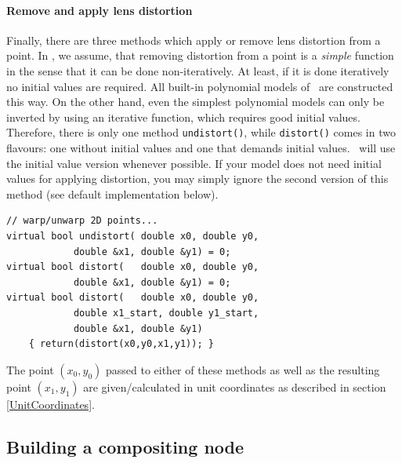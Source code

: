 \documentclass[10pt,a4paper]{article}
\begin{document}
\paragraph{Remove and apply lens distortion}
Finally, there are three methods which apply or remove lens distortion from a point.
In \tde, we assume, that removing distortion from a point is a {\it simple} function
in the sense that it can be done non-iteratively. At least, if it is done iteratively
no initial values are required. All built-in polynomial models of \tde\ are constructed
this way. On the other hand, even the simplest polynomial models can only be inverted
by using an iterative function, which requires good initial values.
Therefore, there is only one method {\tt undistort()}, while {\tt distort()} comes in two
flavours: one without initial values and one that demands initial values.
\tde\ will use the initial value version whenever possible. If your model does not need
initial values for applying distortion, you may simply ignore the second version of this
method (see default implementation below).
\begin{lstlisting}[language=mycpp,tabsize=8]
// warp/unwarp 2D points...
virtual bool undistort(	double x0, double y0,
			double &x1, double &y1) = 0;
virtual bool distort(	double x0, double y0,
			double &x1, double &y1) = 0;
virtual bool distort(	double x0, double y0,
			double x1_start, double y1_start,
			double &x1, double &y1)
	{ return(distort(x0,y0,x1,y1)); }
\end{lstlisting}
The point $(x_0,y_0)$ passed to either of these methods as well as the resulting point $(x_1,y_1)$
are given/calculated in unit coordinates as described in section \ref{UnitCoordinates}.

\subsection{Building a compositing node}
\end{document}
